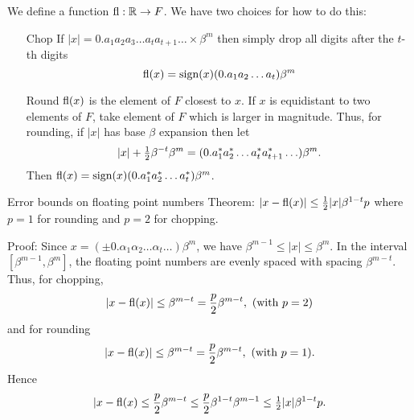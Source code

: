 \documentclass{beamer}
\begin{document}
\begin{frame}
We define a function $\text{fl}: \mathbb{R} \to F$. We have two choices for how to do this:
\begin{itemize}
\item[Chop] If $|x| = 0.a_1 a_2 a_3 \ldots a_t a_{t+1} \ldots \times \beta^m$ then simply drop all digits
after the $t$-th digits
\begin{equation*}
\text{fl}(x) = \text{sign}(x) (0.a_1 a_2 \ldots a_t) \beta^m
\end{equation*}
\item[Round] $\text{fl}(x)$ is the element of $F$ closest to $x$. If $x$ is equidistant to two elements
of $F$, take element of $F$ which is larger in magnitude. Thus, for rounding, if $|x|$ has base $\beta$
expansion then let
\begin{equation*}
|x| + \tfrac{1}{2} \beta^{-t} \beta^m = (0.a_1^* a_2^* \ldots a_t^* a_{t+1}^*\ldots) \beta^m.
\end{equation*}
Then $\text{fl}(x) = \text{sign}(x) (0.a_1^* a_2^* \ldots a_t^*) \beta^m$.
\end{itemize}
\end{frame}

\begin{frame}{Error bounds on floating point numbers}
Theorem: $|x - \text{fl}(x)| \leq \tfrac{1}{2} |x| \beta^{1-t} p$
where $p=1$ for rounding and $p=2$ for chopping.

Proof: Since $x = (\pm 0.\alpha_1 \alpha_2 \ldots \alpha_t \ldots) \beta^m$, we have
$\beta^{m-1} \leq |x| \leq \beta^m$. In the interval $[\beta^{m-1}, \beta^m]$, the floating point numbers
are evenly spaced with spacing $\beta^{m - t}$. Thus, for chopping,
\begin{equation*}
|x - \text{fl}(x)| \leq \beta^{m - t} = \frac{p}{2} \beta^{m-t}, \text{ (with $p = 2$)}
\end{equation*}
and for rounding
\begin{equation*}
|x - \text{fl}(x)| \leq \beta^{m - t} = \frac{p}{2} \beta^{m-t}, \text{ (with $p = 1$)}.
\end{equation*}
Hence
\begin{equation*}
|x - \text{fl}(x) \leq \frac{p}{2} \beta^{m - t} \leq \frac{p}{2} \beta^{1-t} \beta^{m-1} \leq \tfrac{1}{2} |x| \beta^{1-t} p.
\end{equation*}
\end{frame}
\end{document}

